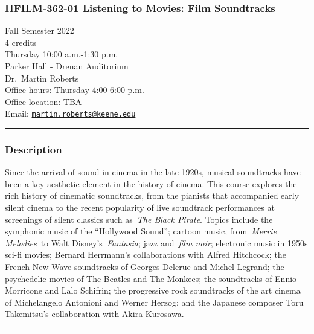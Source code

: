 \documentclass[]{tufte-handout}
\author{Martin Roberts}
\date{2022-09-01}
\begin{document}
\hypertarget{iifilm-362-01-listening-to-movies-film-soundtracks}{%
\subsubsection{IIFILM-362-01 Listening to Movies: Film
Soundtracks}\label{iifilm-362-01-listening-to-movies-film-soundtracks}}

Fall Semester 2022\\
4 credits\\
Thursday 10:00 a.m.-1:30 p.m.\\
Parker Hall - Drenan Auditorium\\
Dr.~Martin Roberts\\
Office hours: Thursday 4:00-6:00 p.m.\\
Office location: TBA\\
Email:
\href{mailto:martin.roberts@keene.edu}{\nolinkurl{martin.roberts@keene.edu}}

\begin{center}\rule{0.5\linewidth}{0.5pt}\end{center}

\hypertarget{description}{%
\subsubsection{Description}\label{description}}

Since the arrival of sound in cinema in the late 1920s, musical
soundtracks have been a key aesthetic element in the history of cinema.
This course explores the rich history of cinematic soundtracks, from the
pianists that accompanied early silent cinema to the recent popularity
of live soundtrack performances at screenings of silent classics such
as~\emph{The Black Pirate}. Topics include the symphonic music of the
``Hollywood Sound''; cartoon music, from~\emph{Merrie Melodies}~to Walt
Disney's~\emph{Fantasia}; jazz and~\emph{film noir}; electronic music in
1950s sci-fi movies; Bernard Herrmann's collaborations with Alfred
Hitchcock; the French New Wave soundtracks of Georges Delerue and Michel
Legrand; the psychedelic movies of The Beatles and The Monkees; the
soundtracks of Ennio Morricone and Lalo Schifrin; the progressive rock
soundtracks of the art cinema of Michelangelo Antonioni and Werner
Herzog; and the Japanese composer Toru Takemitsu's collaboration with
Akira Kurosawa.

\begin{center}\rule{0.5\linewidth}{0.5pt}\end{center}
\end{document}
